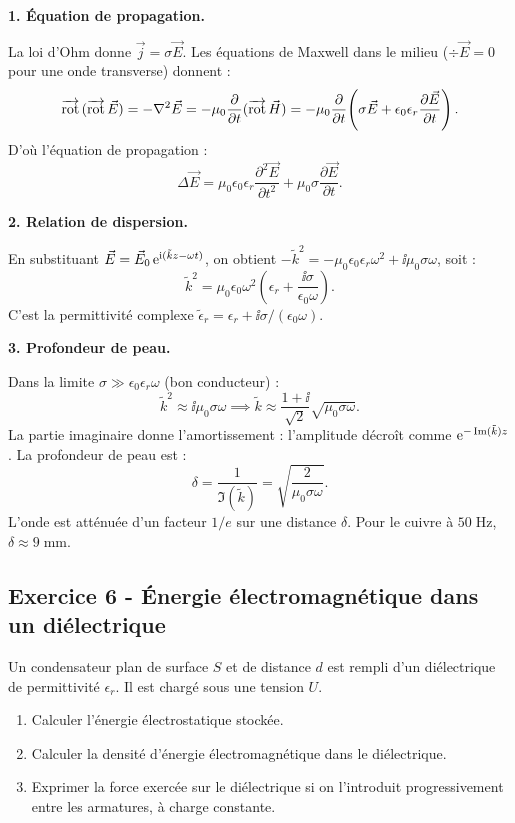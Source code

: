 \documentclass[12pt,a4paper]{article}
\begin{document}
\begin{boitecorrige}

\textbf{1. Équation de propagation.}

La loi d'Ohm donne $\vec{j} = \sigma\vec{E}$. Les équations de Maxwell dans le milieu ($\div\vec{E}=0$ pour une onde transverse) donnent :
\[
\overrightarrow{\mathrm{rot}}\,(\overrightarrow{\mathrm{rot}}\,\vec{E}) = -\nabla^2\vec{E} = -\mu_0\frac{\partial}{\partial t}(\overrightarrow{\mathrm{rot}}\,\vec{H}) = -\mu_0\frac{\partial}{\partial t}\!\left(\sigma\vec{E}+\epsilon_0\epsilon_r\frac{\partial\vec{E}}{\partial t}\right).
\]
D'où l'équation de propagation :
\[
\Delta\vec{E} = \mu_0\epsilon_0\epsilon_r\frac{\partial^2\vec{E}}{\partial t^2} + \mu_0\sigma\frac{\partial\vec{E}}{\partial t}.
\]

\textbf{2. Relation de dispersion.}

En substituant $\vec{E} = \vec{E}_0\,\mathrm{e}^{\mathrm{i}(\tilde{k}z-\omega t)}$, on obtient $-\tilde{k}^2 = -\mu_0\epsilon_0\epsilon_r\omega^2 + \ii\mu_0\sigma\omega$, soit :
\[
\tilde{k}^2 = \mu_0\epsilon_0\omega^2\!\left(\epsilon_r + \frac{\ii\sigma}{\epsilon_0\omega}\right).
\]
C'est la permittivité complexe $\tilde{\epsilon}_r = \epsilon_r + \ii\sigma/(\epsilon_0\omega)$.

\textbf{3. Profondeur de peau.}

Dans la limite $\sigma\gg\epsilon_0\epsilon_r\omega$ (bon conducteur) :
\[
\tilde{k}^2 \approx \ii\mu_0\sigma\omega
\implies \tilde{k} \approx \frac{1+\ii}{\sqrt{2}}\sqrt{\mu_0\sigma\omega}.
\]
La partie imaginaire donne l'amortissement : l'amplitude décroît comme $\mathrm{e}^{-\Im(\tilde{k})z}$. La profondeur de peau est :
\[
\boxed{\delta = \frac{1}{\Im(\tilde{k})} = \sqrt{\frac{2}{\mu_0\sigma\omega}}.}
\]
L'onde est atténuée d'un facteur $1/e$ sur une distance $\delta$. Pour le cuivre à $50\;\text{Hz}$, $\delta\approx 9\;\text{mm}$.

\end{boitecorrige}

\subsection*{Exercice 6 - Énergie électromagnétique dans un diélectrique \niveau{\moyen}}

\begin{boiteexercice}
Un condensateur plan de surface $S$ et de distance $d$ est rempli d'un diélectrique de permittivité $\epsilon_r$. Il est chargé sous une tension $U$.
\begin{enumerate}
  \item Calculer l'énergie électrostatique stockée.
  \item Calculer la densité d'énergie électromagnétique dans le diélectrique.
  \item Exprimer la force exercée sur le diélectrique si on l'introduit progressivement entre les armatures, à charge constante.
\end{enumerate}
\end{boiteexercice}
\end{document}
